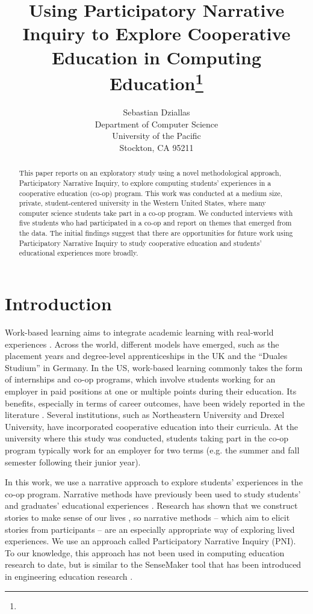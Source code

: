 \documentclass{article}
\title{Using Participatory Narrative Inquiry to Explore Cooperative Education in Computing Education\footnote{\protect}
}
\author{
  Sebastian Dziallas\\
  Department of Computer Science\\
  University of the Pacific\\
  Stockton, CA 95211\\
  \email{sdziallas@pacific.edu}
}
\begin{document}
\maketitle

\begin{abstract}
This paper reports on an exploratory study using a novel methodological approach, Participatory Narrative Inquiry, to explore computing students’ experiences in a cooperative education (co-op) program. This work was conducted at a medium size, private, student-centered university in the Western United States, where many computer science students take part in a co-op program. We conducted interviews with five students who had participated in a co-op and report on themes that emerged from the data. The initial findings suggest that there are opportunities for future work using Participatory Narrative Inquiry to study cooperative education and students’ educational experiences more broadly.

\end{abstract}

\section{Introduction}
Work-based learning aims to integrate academic learning with real-world experiences \cite{fincherPorousClassroomProfessional2013a, maguireBackFutureShaping2019}. Across the world, different models have emerged, such as the placement years and degree-level apprenticeships in the UK and the “Duales Studium” in Germany. In the US, work-based learning commonly takes the form of internships and co-op programs, which involve students working for an employer in paid positions at one or multiple points during their education. Its benefits, especially in terms of career outcomes, have been widely reported in the literature \cite{ramirezAcademicOutcomesCooperative2015}. Several institutions, such as Northeastern University and Drexel University, have incorporated cooperative education into their curricula. At the university where this study was conducted, students taking part in the co-op program typically work for an employer for two terms (e.g. the summer and fall semester following their junior year).

In this work, we use a narrative approach to explore students’ experiences in the co-op program. Narrative methods have previously been used to study students’ and graduates’ educational experiences \cite{dziallasAspectsGraduatenessComputing2016, holmegaardWhereEngineeringApplied2016}. Research has shown that we construct stories to make sense of our lives \cite{mcadamsWhatWeKnow1995}, so narrative methods – which aim to elicit stories from participants – are an especially appropriate way of exploring lived experiences. We use an approach called Participatory Narrative Inquiry (PNI). To our knowledge, this approach has not been used in computing education research to date, but is similar to the SenseMaker tool that has been introduced in engineering education research \cite{sochackaUsingSenseMakerExamine2020}.
\end{document}

